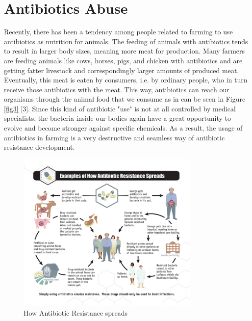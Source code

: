 \section{Antibiotics Abuse}

Recently, there has been a tendency among people related to farming to use antibiotics as nutrition for animals. The feeding of animals with antibiotics tends to result in larger body sizes, meaning more meat for production. Many farmers are feeding animals like cows, horses, pigs, and chicken with antibiotics and are getting fatter livestock and correspondingly larger amounts of produced meat. Eventually, this meat is eaten by consumers, i.e. by ordinary people, who in turn receive those antibiotics with the meat. This way, antibiotics can reach our organisms through the animal food that we consume as in can be seen in Figure \ref{fig3} [3]. Since this kind of antibiotic "use" is not at all controlled by medical specialists, the bacteria inside our bodies again have a great opportunity to evolve and become stronger against specific chemicals. As a result, the usage of antibiotics in farming is a very destructive and seamless way of antibiotic resistance development.

\begin{figure}[H]
  \centering
  \includegraphics[width=0.8\textwidth]{img/Fig4}
  \caption{How Antibiotic Resistance spreads}
  \label{fig4}
\end{figure}

